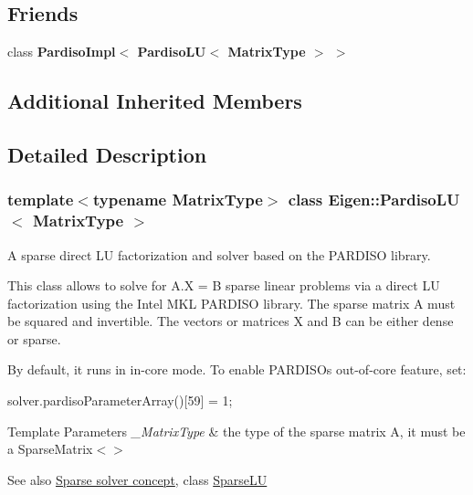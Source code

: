\subsection*{Friends}
\begin{DoxyCompactItemize}
\item 
\mbox{\label{class_eigen_1_1_pardiso_l_u_ac6b89366233dede3acb259c751a4006a}} 
class {\bfseries Pardiso\+Impl$<$ Pardiso\+L\+U$<$ Matrix\+Type $>$ $>$}
\end{DoxyCompactItemize}
\subsection*{Additional Inherited Members}


\subsection{Detailed Description}
\subsubsection*{template$<$typename Matrix\+Type$>$\newline
class Eigen\+::\+Pardiso\+L\+U$<$ Matrix\+Type $>$}

A sparse direct LU factorization and solver based on the P\+A\+R\+D\+I\+SO library. 

This class allows to solve for A.\+X = B sparse linear problems via a direct LU factorization using the Intel M\+KL P\+A\+R\+D\+I\+SO library. The sparse matrix A must be squared and invertible. The vectors or matrices X and B can be either dense or sparse.

By default, it runs in in-\/core mode. To enable P\+A\+R\+D\+I\+SO\textquotesingle{}s out-\/of-\/core feature, set\+: 
\begin{DoxyCode}
solver.pardisoParameterArray()[59] = 1; 
\end{DoxyCode}



\begin{DoxyTemplParams}{Template Parameters}
{\em \+\_\+\+Matrix\+Type} & the type of the sparse matrix A, it must be a Sparse\+Matrix$<$$>$\\
\hline
\end{DoxyTemplParams}


\begin{DoxySeeAlso}{See also}
\hyperlink{SparseLinearSystems.dox_TutorialSparseSolverConcept}{Sparse solver concept}, class \hyperlink{group___sparse_l_u___module_class_eigen_1_1_sparse_l_u}{Sparse\+LU} 
\end{DoxySeeAlso}


